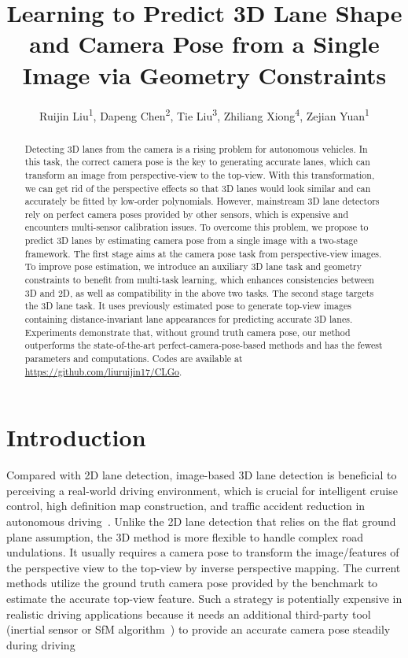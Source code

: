 \documentclass[letterpaper]{article} \usepackage{aaai22}  \usepackage{times}  \usepackage{helvet}  \usepackage{courier}  \usepackage[hyphens]{url}  \usepackage{graphicx} \urlstyle{rm} \def\UrlFont{\rm}  \usepackage{natbib}  \usepackage{caption}
\title{Learning to Predict 3D Lane Shape and Camera Pose  from a Single Image via Geometry Constraints}
\author {
Ruijin Liu\textsuperscript{\rm 1},
    Dapeng Chen\textsuperscript{\rm 2}, 
    Tie Liu\textsuperscript{\rm 3}, 
    Zhiliang Xiong\textsuperscript{\rm 4},
    Zejian Yuan\textsuperscript{\rm 1}
}
\begin{document}
\maketitle

\begin{abstract}
Detecting 3D lanes from the camera is a rising problem for autonomous vehicles. In this task,  the correct camera pose is the key to generating accurate lanes, which can transform an image from perspective-view to the top-view. With this transformation, we can get rid of the perspective effects so that 3D lanes would look similar and can accurately be fitted by low-order polynomials. However, mainstream 3D lane detectors rely on perfect camera poses provided by other sensors, which is expensive and encounters multi-sensor calibration issues.  To overcome this problem, we propose to predict 3D lanes by estimating camera pose from a single image with a two-stage framework. The first stage aims at the camera pose task from perspective-view images. To improve pose estimation, we introduce an auxiliary 3D lane task and geometry constraints to benefit from multi-task learning, which enhances consistencies between 3D and 2D, as well as compatibility in the above two tasks. The second stage targets the 3D lane task. It uses previously estimated pose to generate top-view images containing distance-invariant lane appearances for predicting accurate 3D lanes. Experiments demonstrate that, without ground truth camera pose, our method outperforms the state-of-the-art perfect-camera-pose-based methods and has the fewest parameters and computations. Codes are available at \url{https://github.com/liuruijin17/CLGo}.
\end{abstract}

\section{Introduction}

\noindent Compared with 2D lane detection, image-based 3D lane detection is beneficial to perceiving a real-world driving environment, which is crucial for intelligent cruise control, high definition map construction, and traffic accident reduction in autonomous driving~\cite{HDMaps, Uncertainty}. Unlike the  2D lane detection that relies on the flat ground plane assumption, the 3D method is more flexible to handle complex road undulations. It usually requires a camera pose to transform the image/features of the perspective view to the top-view by inverse perspective mapping. The current methods utilize the ground truth camera pose provided by the benchmark to estimate the accurate top-view feature. Such a strategy is potentially expensive in realistic driving applications because it needs an additional third-party tool (inertial sensor or SfM algorithm~\cite{SfM,IMU}) to provide an accurate camera pose steadily during driving~\cite{Gen3rdTool,GenLaneNet}
\end{document}
